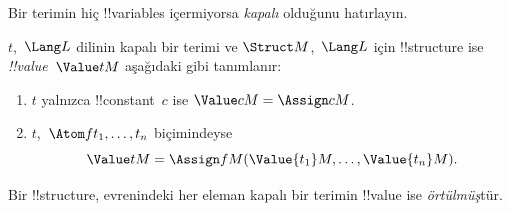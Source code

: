 



\begin{explain}
Bir terimin hiç !!{variable}s içermiyorsa \emph{kapalı} olduğunu
hatırlayın.
\end{explain}

\begin{defn}
$t$,~$\Lang L$ dilinin kapalı bir terimi ve $\Struct M$,~$\Lang L$
için !!{structure} ise \emph{!!{value}}~$\Value tM$ aşağıdaki gibi
tanımlanır:
\begin{enumerate}
\item $t$ yalnızca !!{constant}~$c$ ise $\Value cM=\Assign cM$.
\item $t$,~$\Atom f{t_1,\ldots,t_n}$ biçimindeyse
  \[
  \Value tM=\Assign fM(\Value{t_1}M,\ldots,\Value{t_n}M).
  \]
\end{enumerate}
\end{defn}

\begin{defn}
Bir !!{structure}, evrenindeki her eleman kapalı bir terimin
!!{value} ise \emph{örtülmüş}tür.
\end{defn}

